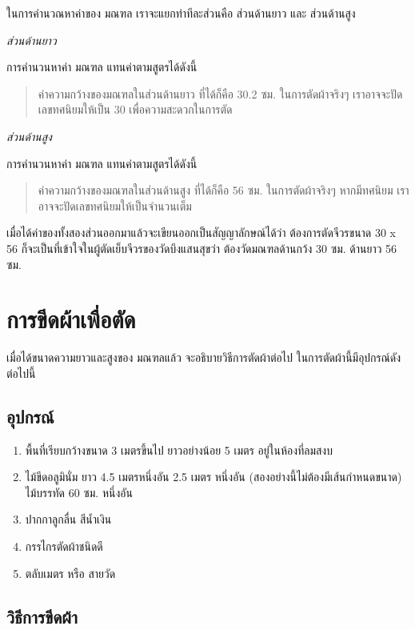 ในการคำนวณหาค่าของ มณฑล เราจะแยกทำทีละส่วนคือ ส่วนด้านยาว และ ส่วนด้านสูง

\emph{ส่วนด้านยาว}

การคำนวนหาค่า มณฑล แทนค่าตามสูตรได้ดังนี้

\begin{quote}
ค่าความกว้างของมณฑลในส่วนด้านยาว ที่ได้ก็คือ 30.2 ซม. ในการตัดผ้าจริงๆ
เราอาจจะปัดเลขทศนิยมให้เป็น 30 เพื่อความสะดวกในการตัด
\end{quote}

\emph{ส่วนด้านสูง}

การคำนวนหาค่า มณฑล แทนค่าตามสูตรได้ดังนี้

\begin{quote}
ค่าความกว้างของมณฑลในส่วนด้านสูง ที่ได้ก็คือ 56 ซม. ในการตัดผ้าจริงๆ หากมีทศนิยม
เราอาจจะปัดเลขทศนิยมให้เป็นจำนวนเต็ม
\end{quote}

เมื่อได้ค่าของทั้งสองส่วนออกมาแล้วจะเขียนออกเป็นสัญญาลักษณ์ได้ว่า ต้องการตัดจีวรขนาด 30 x
56 ก็จะเป็นที่เข้าใจในผู้ตัดเย็บจีวรของวัดบึงแสนสุขว่า ต้องวัดมณฑลด้านกว้ง 30 ซม. ด้านยาว
56 ซม.

\section{การขีดผ้าเพื่อตัด}

เมื่อได้ขนาดความยาวและสูงของ มณฑลแล้ว จะอธิบายวิธีการตัดผ้าต่อไป
ในการตัดผ้านี้มีอุปกรณ์ดังต่อไปนี้

\subsection{อุปกรณ์}

\begin{enumerate}
\def\labelenumi{(\arabic{enumi})}
\item
  พื้นที่เรียบกว้างขนาด 3 เมตรขึ้นไป ยาวอย่างน้อย 5 เมตร อยู่ในห้องที่ลมสงบ
\item
  ไม้ขีดอลูมินั่ม ยาว 4.5 เมตรหนึ่งอัน 2.5 เมตร หนึ่งอัน
  (สองอย่างนี้ไม่ต้องมีเส้นกำหนดขนาด) ไม้บรรทัด 60 ซม. หนึ่งอัน
\item
  ปากกาลูกลื่น สีน้ำเงิน
\item
  กรรไกรตัดผ้าชนิดดี
\item
  ตลับเมตร หรือ สายวัด
\end{enumerate}

\subsection{วิธีการขีดผ้า}

